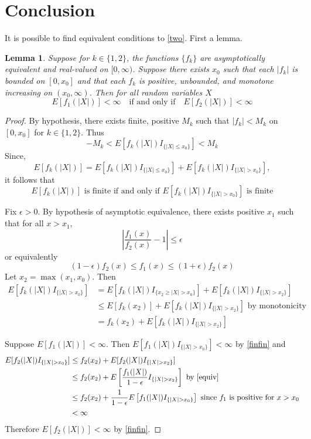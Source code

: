 \documentclass[letterpaper, 12pt]{article}
\newtheorem{lem}{Lemma}
\begin{document}
\section*{Conclusion}
It is possible to find equivalent conditions to \eqref{two}. First a lemma.

\begin{lem}
Suppose for $k \in \{1,2 \}$, the functions $\{f_k\}$ are asymptotically equivalent and real-valued on $[0, \infty)$. Suppose there exists $x_0$ such that each $|f_k|$ is bounded on $[0, x_0]$ and that each $f_k$ is positive, unbounded, and monotone increasing on $(x_0, \infty)$. Then for all random variables $X$
\[
E[f_1(|X|)] < \infty \quad \text{if and only if} \quad
E[f_2(|X|)] < \infty
\]
\end{lem}
\begin{proof}
By hypothesis, there exists finite, positive $M_k$ such that
$|f_k| < M_k$ on $[0, x_0]$ for $k\in \{1,2\}$. Thus 
\[
-M_k < E[f_k(|X|)I_{\{|X| \leq x_0\}}] < M_k
\]
Since, 
\[
E[f_k(|X|)] = E[f_k(|X|)I_{\{|X| \leq x_0\}}] + E[f_k(|X|)I_{\{|X| > x_0\}}],
\]
it follows that 
\begin{equation}
E[f_k(|X|)] \text{ is finite if and only if } E[f_k(|X|)I_{\{|X| > x_0\}}] \text{ is finite}
\label{finfin}
\end{equation}


Fix $\epsilon > 0$. 
By hypothesis of asymptotic equivalence, there exists positive $x_1$ such that for all $x > x_1$, 
\[
\left \lvert
\frac{f_1(x)}{f_2(x)} -1
\right \rvert
\leq 
\epsilon
\]
or equivalently
\begin{equation}
(1-\epsilon)f_2(x) \leq 
f_1(x)
\leq 
(1+\epsilon)f_2(x)
\label{equiv}
\end{equation}
Let $x_2 = \max(x_1, x_0)$. Then
\begin{align*}
E[f_k(|X|)I_{\{|X| > x_0\}}]
&=
E[f_k(|X|)I_{\{x_2 \geq |X| > x_0\}}]
+
E[f_k(|X|)I_{\{|X| > x_2\}}]
\\
&\leq
E[f_k(x_2)]
+
E[f_k(|X|)I_{\{|X| > x_2\}}] \text{ by monotonicity}
\\
&=
f_k(x_2)
+
E[f_k(|X|)I_{\{|X| > x_2\}}]
\end{align*}

Suppose $E[f_1(|X|)] < \infty$. Then $E[f_1(|X|)I_{\{|X| > x_0\}}] < \infty$ by \eqref{finfin} and 
\begin{align*}
E[f_2(|X|)I_{\{|X| > x_0\}}]
&\leq
f_2(x_2) + E[f_2(|X|)I_{\{|X| > x_2\}}]
\\
&\leq
f_2(x_2) + E\left[\frac{f_1(|X|)}{1-\epsilon}I_{\{|X| > x_2\}}\right]
\text{ by \eqref{equiv}}
\\
&\leq
f_2(x_2) + 
\frac{1}{1-\epsilon}
E\left[f_1(|X|)I_{\{|X| > x_0\}}\right]
\text{ since $f_1$ is positive for $x>x_0$}
\\
&< \infty
\end{align*}
Therefore $E[f_2(|X|)] < \infty$ by \eqref{finfin}.


\end{proof}
\end{document}
